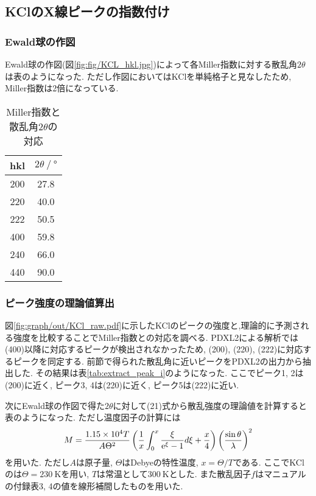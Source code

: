 \subsection{KClのX線ピークの指数付け}
\subsubsection{Ewald球の作図}
Ewald球の作図(図\ref{fig:fig/KCL_hkl.jpg})によって各Miller指数に対する散乱角$2\theta$は表のようになった.
ただし作図においてはKClを単純格子と見なしたため,
Miller指数は2倍になっている.

\begin{table}[h]
  \caption{Miller指数と散乱角$2\theta$の対応}
  \label{tab:miller_kclhkl}
  \centering
  \begin{tabular}{cc}
    \hline
    hkl&$2\theta\ /\ \si{\degree}$\\
    \hline \hline
    200&27.8\\
    220&40.0\\
    222&50.5\\
    400&59.8\\
    240&66.0\\
    440&90.0\\
    \hline
  \end{tabular}
\end{table}
\subsubsection{ピーク強度の理論値算出}
図\ref{fig:graph/out/KCl_raw.pdf}に示したKClのピークの強度と,理論的に予測される強度を比較することでMiller指数との対応を調べる.
PDXL2による解析では(400)以降に対応するピークが検出されなかったため,
(200), (220), (222)に対応するピークを同定する.
前節で得られた散乱角に近いピークをPDXL2の出力から抽出した.
その結果は表\ref{tab:extract_peak_i}のようになった.
ここでピーク1, 2は(200)に近く,
ピーク3, 4は(220)に近く,
ピーク5は(222)に近い.

次にEwald球の作図で得た$2\theta$に対して(21)式から散乱強度の理論値を計算すると表のようになった.
ただし温度因子の計算には
\begin{align}
  M=\frac{1.15\times10^4 T}{A\Theta^2}\left(\frac{1}{x}\int_0^x\frac{\xi}{{\rm e}^\xi-1}d\xi+\frac{x}{4}\right)\left(\frac{\sin\theta}{\lambda}\right)^2
\end{align}
を用いた.\cite{alma990007897430204034}
ただし$A$は原子量, $\Theta$はDebyeの特性温度, $x=\Theta/T$である.
ここでKClのは$\Theta=230\ \si{\kelvin}$を用い, $T$は常温として$300\ \si{\kelvin}$とした.\cite{2001167}
また散乱因子$f$はマニュアルの付録表3, 4の値を線形補間したものを用いた.

